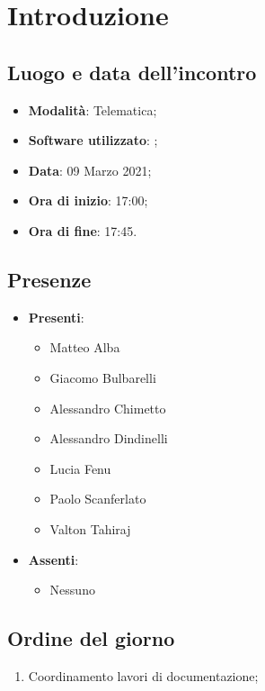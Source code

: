 \documentclass[]{article}
\begin{document}
	
	
	
	\newpage
	
	
		\section{Introduzione}
		\subsection{Luogo e data dell'incontro}
		\begin{itemize}
			\item \textbf{Modalità}: Telematica;
			\item \textbf{Software utilizzato}: ;
			\item \textbf{Data}: 09 Marzo 2021;
			\item \textbf{Ora di inizio}: 17:00;
			\item \textbf{Ora di fine}: 17:45.
		\end{itemize}

		\subsection{Presenze}
		\begin{itemize}
			\item \textbf{Presenti}:
			\begin{itemize}
				\item Matteo Alba
				\item Giacomo Bulbarelli
				\item Alessandro Chimetto
				\item Alessandro Dindinelli
				\item Lucia Fenu
				\item Paolo Scanferlato
				\item Valton Tahiraj
			\end{itemize}
			\item \textbf{Assenti}:
			\begin{itemize}
				\item Nessuno
			\end{itemize}
		\end{itemize}


		\subsection{Ordine del giorno}
		\begin{enumerate}
			\item Coordinamento lavori di documentazione;
		\end{enumerate}
\end{document}
